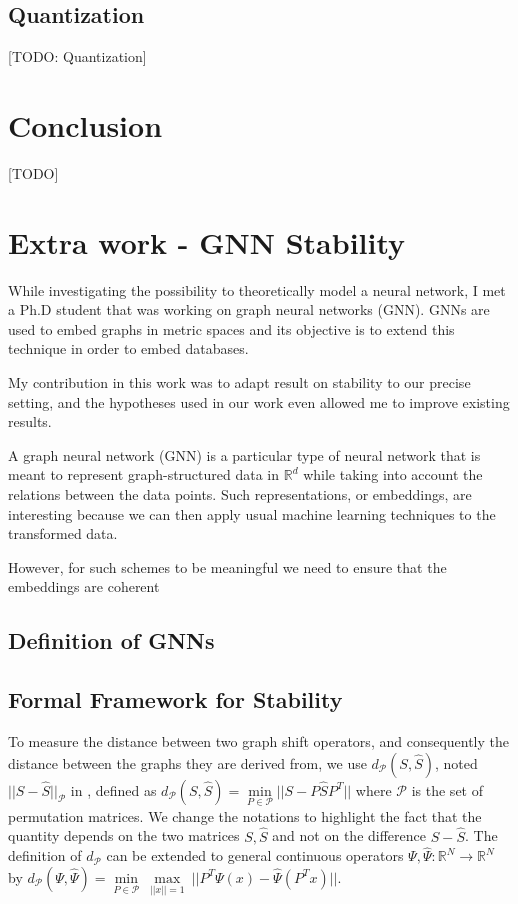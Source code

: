 \documentclass[11pt,a4paper]{article}
\newcommand{\bb}[1]{\mathbb{#1}}
\newcommand{\R}{\bb{R}}
\newcommand{\cP}{\mathcal{P}}
\theoremstyle{definition}
\begin{document}
		
\subsection{Quantization}
	
	[TODO: Quantization]
	
\section{Conclusion}

	[TODO]
	
\section{Extra work - GNN Stability}
	While investigating the possibility to theoretically model a neural network, I met a Ph.D student that was working on graph neural networks (GNN). GNNs are used to embed graphs in metric spaces and its objective is to extend this technique in order to embed databases.
	
	My contribution in this work was to adapt result on stability to our precise setting, and the hypotheses used in our work even allowed me to improve existing results.

	A graph neural network (GNN) is a particular type of neural network that is meant to represent graph-structured data in $\R^d$ while taking into account the relations between the data points. Such representations, or embeddings, are interesting because we can then apply usual machine learning techniques to the transformed data.
	
	However, for such schemes to be meaningful we need to ensure that the embeddings are coherent 

\subsection{Definition of GNNs}

	

\subsection{Formal Framework for Stability}

To measure the distance between two graph shift operators, and consequently the distance between the graphs they are derived from, we use $d_{\cP}(S, \hat{S})$, noted $||S - \hat{S}||_\cP$ in \cite{gama2020stability},  defined as $d_\cP(S,\hat{S})=\underset{P \in \cP}{\min} ||S-P \hat{S} P^T ||$ where $\cP$ is the set of permutation matrices. We change the notations to highlight the fact that the quantity depends on the two matrices $S,\hat{S}$ and not on the difference $S-\hat{S}$. The definition of $d_\cP$ can be extended to general continuous operators $\Psi, \hat{\Psi}: \mathbb{R}^N \to \mathbb{R}^N$ by $d_\cP (\Psi, \hat{\Psi}) = \underset{P \in \cP}{\min} \ \underset{||x|| = 1}{\max} \ || P^T \Psi (x) - \hat{\Psi}(P^T x) ||$.
\end{document}
